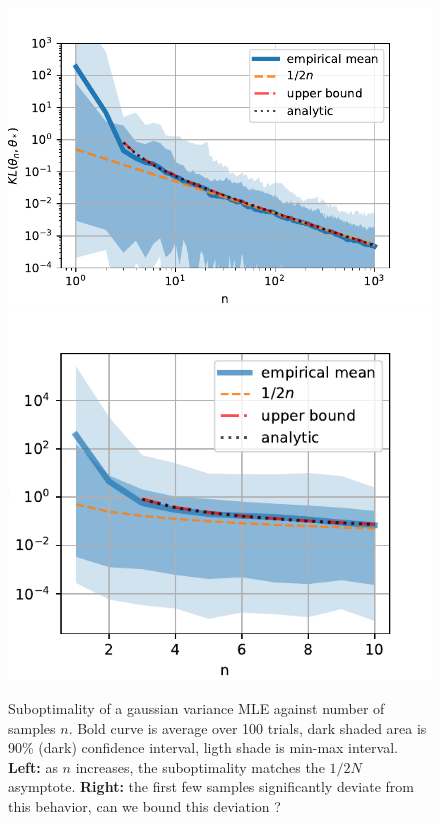 \documentclass{article}
\begin{document}
\begin{figure}[h]
	\centering
	\includegraphics[width=.54\textwidth]{figs/asymptote.pdf}
	\includegraphics[width=.43\textwidth]{figs/fewsamples.pdf}
	\caption{Suboptimality of a gaussian variance MLE against number of samples $n$. Bold curve is average over 100 trials,  dark shaded area is 90\% (dark) confidence interval, ligth shade is min-max interval.  
	\textbf{Left:} as $n$ increases, the suboptimality matches the $1/2N$ asymptote.
	\textbf{Right:} the first few samples significantly deviate from this behavior, can we bound this deviation ? 
	}
	\label{fig:curves}
\end{figure}
\end{document}
